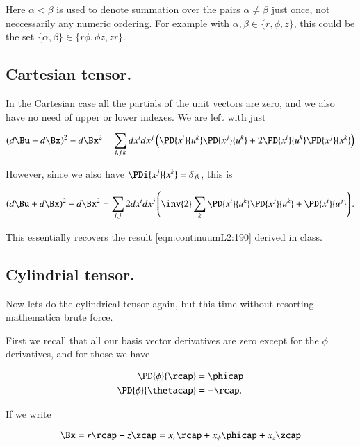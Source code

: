 Here $\alpha < \beta$ is used to denote summation over the pairs $\alpha \ne \beta$ just once, not neccessarily any numeric ordering.  For example with $\alpha, \beta \in \{r, \phi, z\}$, this could be the set $\{\alpha, \beta\} \in \{r \phi, \phi z, z r\}$.

\subsection{Cartesian tensor.}

In the Cartesian case all the partials of the unit vectors are zero, and we also have no need of upper or lower indexes.  We are left with just

\begin{equation}\label{eqn:continuumL2:630}
(d\Bu + d\Bx)^2 - d\Bx^2 
=
\sum_{i, j, k}
dx^i
dx^j
\left( 
\PD{x^i}{u^k} 
\PD{x^j}{u^k} 
+
2
\PD{x^i}{u^k} 
\PD{x^j}{x^k} 
\right)
\end{equation}

However, since we also have $\PDi{x^j}{x^k} = \delta_{jk}$, this is

\begin{equation}\label{eqn:continuumL2:650}
(d\Bu + d\Bx)^2 - d\Bx^2 
=
\sum_{i, j}
2
dx^i
dx^j
\left( 
\inv{2}
\sum_k
\PD{x^i}{u^k} 
\PD{x^j}{u^k} 
+
\PD{x^i}{u^j} 
\right).
\end{equation}

This essentially recovers the result \ref{eqn:continuumL2:190} derived in class.

\subsection{Cylindrial tensor.}

Now lets do the cylindrical tensor again, but this time without resorting mathematica brute force.

First we recall that all our basis vector derivatives are zero except for the $\phi$ derivatives, and for those we have

\begin{align}\label{eqn:continuumL2:670}
\PD{\phi}{\rcap} &= \phicap \\
\PD{\phi}{\thetacap} &= -\rcap.
\end{align}

If we write

\begin{equation}\label{eqn:continuumL2:690}
\Bx = r \rcap + z \zcap = x_r \rcap + x_\phi \phicap + x_z \zcap
\end{equation}

